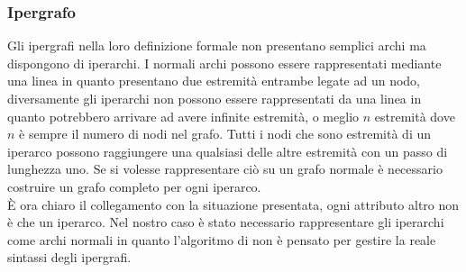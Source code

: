 \subsubsection*{Ipergrafo}
Gli ipergrafi nella loro definizione formale non presentano semplici archi ma dispongono di iperarchi. I normali archi possono essere rappresentati mediante una linea in quanto presentano due estremità entrambe legate ad un nodo, diversamente gli iperarchi non possono essere rappresentati da una linea in quanto potrebbero arrivare ad avere infinite estremità, o meglio $n$ estremità dove $n$ è sempre il numero di nodi nel grafo. Tutti i nodi che sono estremità di un iperarco possono raggiungere una qualsiasi delle altre estremità con un passo di lunghezza uno. Se si volesse rappresentare ciò su un grafo normale è necessario costruire un grafo completo per ogni iperarco.\\
È ora chiaro il collegamento con la situazione presentata, ogni attributo altro non è che un iperarco. Nel nostro caso è stato necessario rappresentare gli iperarchi come archi normali in quanto l'algoritmo di \nv non è pensato per gestire la reale sintassi degli ipergrafi.
%
%
